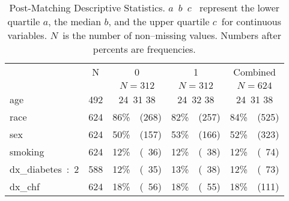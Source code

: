 \documentclass{article}\usepackage[]{graphicx}\usepackage[]{color}
\begin{document}
\begin{table}[H]
\caption{Post-Matching Descriptive Statistics. {\scriptsize $a$\ }{$b$\ }{\scriptsize $c$\ } represent the lower quartile $a$, the median $b$, and the upper quartile $c$\ for continuous variables. $N$\ is the number of non--missing values. Numbers after percents are frequencies.\label{summByDx2}} 
{\centering
\begin{tabular}{lrccc}
\hline\hline
\multicolumn{1}{l}{}&\multicolumn{1}{c}{N}&\multicolumn{1}{c}{0}&\multicolumn{1}{c}{1}&\multicolumn{1}{c}{Combined}\tabularnewline
&&\multicolumn{1}{c}{{\scriptsize $N=312$}}&\multicolumn{1}{c}{{\scriptsize $N=312$}}&\multicolumn{1}{c}{{\scriptsize $N=624$}}\tabularnewline
\hline
age&492&{\scriptsize 24~}{31 }{\scriptsize 38} &{\scriptsize 24~}{32 }{\scriptsize 38} &{\scriptsize 24~}{31 }{\scriptsize 38} \tabularnewline
race&624&86\%~{\scriptsize~(268)}&82\%~{\scriptsize~(257)}&84\%~{\scriptsize~(525)}\tabularnewline
sex&624&50\%~{\scriptsize~(157)}&53\%~{\scriptsize~(166)}&52\%~{\scriptsize~(323)}\tabularnewline
smoking&624&12\%~{\scriptsize~(~36)}&12\%~{\scriptsize~(~38)}&12\%~{\scriptsize~(~74)}\tabularnewline
dx\_diabetes~:~2&588&12\%~{\scriptsize~(~35)}&13\%~{\scriptsize~(~38)}&12\%~{\scriptsize~(~73)}\tabularnewline
dx\_chf&624&18\%~{\scriptsize~(~56)}&18\%~{\scriptsize~(~55)}&18\%~{\scriptsize~(111)}\tabularnewline
\hline
\end{tabular}}

\end{table}
\end{document}
